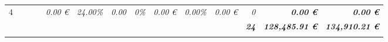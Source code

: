 \begin{table}[]
\begin{tabular}{cllllrrrrrrrrrr}
4                                                                                       & \multicolumn{2}{l}{\cellcolor[HTML]{FFFF99}\textit{}}                                                        & \cellcolor[HTML]{FFFF99}              & \cellcolor[HTML]{FFFF99}                     & \cellcolor[HTML]{FFFF99}\textit{0.00 €}                                              & \textit{24.00\%}                                          & \textit{0.00}                                            & \cellcolor[HTML]{FFFF99}\textit{0\%}                                  & \cellcolor[HTML]{92D050}\textit{0.00 €}                               & \cellcolor[HTML]{FFFF99}\textit{0.00\%}                                & \cellcolor[HTML]{92D050}\textit{0.00 €}                                     & \cellcolor[HTML]{FFFF99}\textit{0}                                            & \cellcolor[HTML]{BFBFBF}\textit{\textbf{0.00 €}}                         & \textit{\textbf{0.00 €}}                                                             \\
\rowcolor[HTML]{0070C0} 
\multicolumn{1}{l}{\cellcolor[HTML]{0070C0}{\color[HTML]{FFFFFF} \textbf{Gesamtsumme}}} & \multicolumn{2}{l}{\cellcolor[HTML]{0070C0}\textit{}}                                                        &                                       &                                              & \multicolumn{1}{l}{\cellcolor[HTML]{0070C0}\textit{}}                                & \multicolumn{1}{l}{\cellcolor[HTML]{0070C0}\textit{}}     & \multicolumn{1}{l}{\cellcolor[HTML]{0070C0}\textit{}}    & \multicolumn{1}{l}{\cellcolor[HTML]{0070C0}\textit{}}                 & \multicolumn{1}{l}{\cellcolor[HTML]{0070C0}\textit{}}                 & \multicolumn{1}{l}{\cellcolor[HTML]{0070C0}}                           & \multicolumn{1}{l}{\cellcolor[HTML]{0070C0}\textit{}}                       & {\color[HTML]{FFFFFF} \textit{\textbf{24}}}                                   & {\color[HTML]{FFFFFF} \textit{\textbf{128,485.91 €}}}                    & {\color[HTML]{FFFFFF} \textit{\textbf{134,910.21 €}}}                                \\
\multicolumn{1}{l}{}                                                                    & \multicolumn{2}{l}{\cellcolor[HTML]{FFFF99}\textit{}}                                                        & \cellcolor[HTML]{FFFF99}              & \cellcolor[HTML]{FFFF99}                     & \multicolumn{1}{l}{\cellcolor[HTML]{FFFF99}\textit{}}                                & \multicolumn{1}{l}{\textit{}}                             & \multicolumn{1}{l}{\textit{}}                            & \multicolumn{1}{l}{\cellcolor[HTML]{FFFF99}\textit{}}                 & \multicolumn{1}{l}{\cellcolor[HTML]{92D050}\textit{}}                 & \multicolumn{1}{l}{\cellcolor[HTML]{FFFF99}\textit{}}                  & \multicolumn{1}{l}{\cellcolor[HTML]{92D050}\textit{}}                       & \multicolumn{1}{l}{\cellcolor[HTML]{FFFF99}\textit{}}                         & \multicolumn{1}{l}{\cellcolor[HTML]{BFBFBF}\textit{\textbf{}}}           & \multicolumn{1}{l}{\textit{\textbf{}}}                                               \\

\end{tabular}
\end{table}
